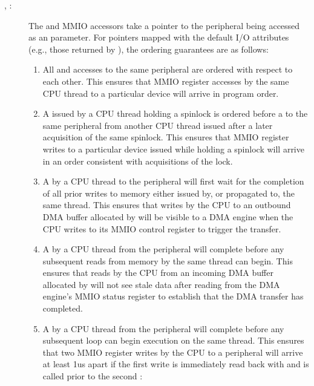 \begin{description}
 \item[, :]
	The  and  MMIO accessors take a pointer to
	the peripheral being accessed as an  parameter.
	For pointers mapped with the default I/O attributes (e.g., those
        returned by ), the ordering guarantees are as follows:

	\begin{enumerate}
	 \item
	   All  and  accesses to the same peripheral
	   are ordered with respect to each other.
	   This ensures that MMIO register accesses by the same CPU thread to
	   a particular device will arrive in program order.

	 \item
	   A  issued by a CPU thread holding a spinlock is ordered
	   before a  to the same peripheral from another CPU thread
	   issued after a later acquisition of the same spinlock.
	   This ensures that MMIO register writes to a particular device
	   issued while holding a spinlock will arrive in an order consistent
	   with acquisitions of the lock.

	 \item
	   A  by a CPU thread to the peripheral will first wait
	   for the completion of all prior writes to memory either issued by, or
	   propagated to, the same thread.
	   This ensures that writes by the CPU to an outbound DMA buffer
	   allocated by  will be visible to a DMA
	   engine when the CPU writes to its MMIO control register to trigger
	   the transfer.

	 \item
	   A  by a CPU thread from the peripheral will complete
	   before any subsequent reads from memory by the same thread can begin.
	   This ensures that reads by the CPU from an incoming DMA buffer
	   allocated by  will not see stale data
	   after reading from the DMA engine's MMIO status register to
	   establish that the DMA transfer has completed.

	 \item
	   A  by a CPU thread from the peripheral will complete
	   before any subsequent  loop can begin execution on the
	   same thread.
	   This ensures that two MMIO register writes by the CPU to a peripheral
	   will arrive at least 1us apart if the first write is immediately read
	   back with  and  is called prior to the
	   second :


\end{enumerate}
\end{description}
